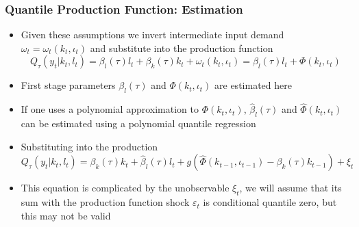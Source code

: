 \documentclass{beamer}
\begin{document}
\begin{frame}
\frametitle{Quantile Production Function: Estimation}
\begin{itemize}
	\item Given these assumptions we invert intermediate input demand $\omega_{t}=\omega_{t}(k_{t}, \iota_{t})$ and substitute into the production function
	\begin{equation}
	Q_{\tau}(y_{t}|k_{t}, l_{t})=\beta_{l}(\tau)l_{t}+\beta_{k}(\tau)k_{t}+\omega_{t}(k_{t}, \iota_{t})=\beta_{l}(\tau)l_{t}+\Phi(k_{t}, \iota_{t})
	\end{equation}
	\pause
	\item First stage parameters $\beta_{l}(\tau)$ and $\Phi(k_{t}, \iota_{t})$ are estimated here
	\item If one uses a polynomial approximation to $\Phi(k_{t}, \iota_{t})$, $\hat{\beta}_{l}(\tau)$ and $\hat{\Phi}(k_{t}, \iota_{t})$ can be estimated using a polynomial quantile regression
	\pause
	\item Substituting into the production
	\begin{equation}
	Q_{\tau}(y_{t}|k_{t}, l_{t})=\beta_{k}(\tau)k_{t}+\hat{\beta}_{l}(\tau)l_{t}+g(\hat{\Phi}(k_{t-1}, \iota_{t-1})-\beta_{k}(\tau)k_{t-1})+\xi_{t}
	\end{equation}
	\pause
	\item This equation is complicated by the unobservable $\xi_{t}$, we will assume that its sum with the production function shock $\varepsilon_{t}$ is conditional quantile zero, but this may not be valid
\end{itemize}
\end{frame}

\end{document}
